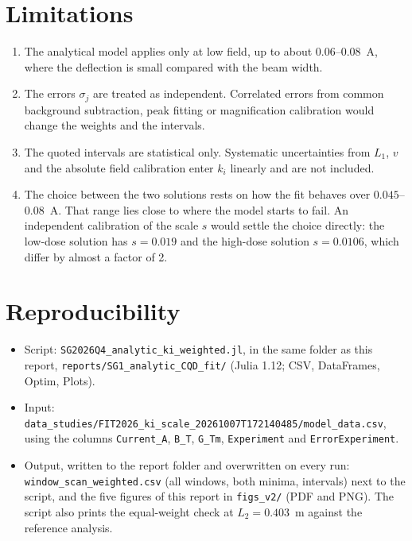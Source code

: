 \documentclass[11pt,a4paper]{article}
\newcommand{\kan}{k_i}
\begin{document}
\section{Limitations}
\begin{enumerate}
\item The analytical model applies only at low field, up to about 0.06--0.08~A, where the deflection is small compared with the beam width.
\item The errors $\sigma_j$ are treated as independent. Correlated errors from common background subtraction, peak fitting or magnification calibration would change the weights and the intervals.
\item The quoted intervals are statistical only. Systematic uncertainties from $L_1$, $v$ and the absolute field calibration enter $\kan$ linearly and are not included.
\item The choice between the two solutions rests on how the fit behaves over $0.045$--$0.08$~A. That range lies close to where the model starts to fail. An independent calibration of the scale $s$ would settle the choice directly: the low-dose solution has $s = 0.019$ and the high-dose solution $s = 0.0106$, which differ by almost a factor of 2.
\end{enumerate}

\section{Reproducibility}
{\sloppy
\begin{itemize}
\item Script: \texttt{SG2026Q4\_analytic\_ki\_weighted.jl}, in the same folder as this report, \texttt{reports/\allowbreak SG1\_analytic\_CQD\_fit/} (Julia 1.12; CSV, DataFrames, Optim, Plots).
\item Input: \texttt{data\_studies/\allowbreak FIT2026\_ki\_scale\_20261007T172140485/\allowbreak model\_data.csv}, using the columns \texttt{Current\_A}, \texttt{B\_T}, \texttt{G\_Tm}, \texttt{Experiment} and \texttt{ErrorExperiment}.
\item Output, written to the report folder and overwritten on every run: \texttt{window\_scan\_weighted.csv} (all windows, both minima, intervals) next to the script, and the five figures of this report in \texttt{figs\_v2/} (PDF and PNG). The script also prints the equal-weight check at $L_2 = 0.403$~m against the reference analysis.
\end{itemize}
\par}
\end{document}
